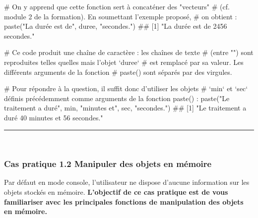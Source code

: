 \documentclass[12pt,twosided, notitlepage]{book}
\newenvironment{Shaded}{}{}
\newcommand{\KeywordTok}[1]{\textcolor[rgb]{0.00,0.00,1.00}{{#1}}}
\newcommand{\StringTok}[1]{\textcolor[rgb]{0.00,0.50,0.50}{{#1}}}
\newcommand{\CommentTok}[1]{\textcolor[rgb]{0.00,0.50,0.00}{{#1}}}
\newcommand{\NormalTok}[1]{{#1}}
\renewenvironment{Shaded}{\begin{snugshade}}{\end{snugshade}}
\begin{document}
\begin{enumerate}
\begin{Shaded}
\begin{Highlighting}[]
\CommentTok{# On y apprend que cette fonction sert à concaténer des "vecteurs"}
\CommentTok{# (cf. module 2 de la formation). En soumettant l'exemple proposé,}
\CommentTok{# on obtient :}
\KeywordTok{paste}\NormalTok{(}\StringTok{"La durée est de"}\NormalTok{, duree, }\StringTok{"secondes."}\NormalTok{)}
  \NormalTok{## [1] "La durée est de 2456 secondes."}

\CommentTok{# Ce code produit une chaîne de caractère : les chaînes de texte}
\CommentTok{# (entre "") sont reproduites telles quelles mais l'objet `duree`}
\CommentTok{# est remplacé par sa valeur. Les différents arguments de la fonction}
\CommentTok{# paste() sont séparés par des virgules.}

\CommentTok{# Pour répondre à la question, il suffit donc d'utiliser les objets}
\CommentTok{# `min` et `sec` définis précédemment comme arguments de la fonction paste() :}
\KeywordTok{paste}\NormalTok{(}\StringTok{"Le traitement a duré"}\NormalTok{, min, }\StringTok{"minutes et"}\NormalTok{, sec, }\StringTok{"secondes."}\NormalTok{)}
  \NormalTok{## [1] "Le traitement a duré 40 minutes et 56 secondes."}
\end{Highlighting}
\end{Shaded}

  \begin{center} \rule{0.5\linewidth}{\linethickness}\end{center}

  \bigskip  \fi 
\end{enumerate}

~

\subsubsection{\texorpdfstring{\textbf{Cas pratique 1.2} Manipuler des
objets en
mémoire}{Cas pratique 1.2 Manipuler des objets en mémoire}}\label{cas-pratique-1.2-manipuler-des-objets-en-memoire}

Par défaut en mode console, l'utilisateur ne dispose d'aucune
information sur les objets stockés en mémoire. \textbf{L'objectif de ce
cas pratique est de vous familiariser avec les principales fonctions de
manipulation des objets en mémoire.}
\end{document}

